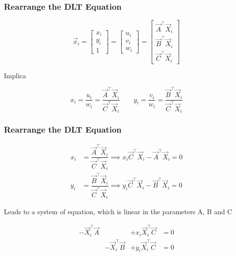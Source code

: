 \begin{frame}
  \frametitle{Rearrange the DLT Equation}

  \begin{equation*}
    \vec{x}_{i} =
    \begin{bmatrix}
      x_{i} \\
      y_{i} \\
      1
    \end{bmatrix} =
    \begin{bmatrix}
      u_{i} \\
      v_{i} \\
      w_{i}
    \end{bmatrix} = 
    \begin{bmatrix}
      \vec{A}^{\top}\vec{X}_{i} \\
      \vec{B}^{\top}\vec{X}_{i} \\
      \vec{C}^{\top}\vec{X}_{i}
    \end{bmatrix}
  \end{equation*}

Implica

  \begin{equation*}
    x_{i} = \dfrac{u_{i}}{w_{i}} = \dfrac{\vec{A}^{\top}\vec{X}_{i}}{\vec{C}^{\top}\vec{X}_{i}}
    \quad \quad
    y_{i} = \dfrac{v_{i}}{w_{i}} = \dfrac{\vec{B}^{\top}\vec{X}_{i}}{\vec{C}^{\top}\vec{X}_{i}}
  \end{equation*}

\end{frame}

\begin{frame}
  \frametitle{Rearrange the DLT Equation}

  \begin{align*}
    x_{i} &= \dfrac{\vec{A}^{\top}\vec{X}_{i}}{\vec{C}^{\top}\vec{X}_{i}} \implies x_{i} \vec{C}^{\top}\vec{X}_{i} - \vec{A}^{\top}\vec{X}_{i} = 0\\
    y_{i} &= \dfrac{\vec{B}^{\top}\vec{X}_{i}}{\vec{C}^{\top}\vec{X}_{i}} \implies y_{i} \vec{C}^{\top}\vec{X}_{i} - \vec{B}^{\top}\vec{X}_{i} = 0
  \end{align*}

  Leads to a system of equation, which is linear in the parameters A, B and C

  \begin{align*}
    -\vec{X}_{i}^{\top}\vec{A}& &+x_{i}\vec{X}_{i}^{\top}\vec{C} &= 0 \\
    &-\vec{X}_{i}^{\top}\vec{B} &+y_{i}\vec{X}_{i}^{\top}\vec{C} &= 0
  \end{align*}

\end{frame}

